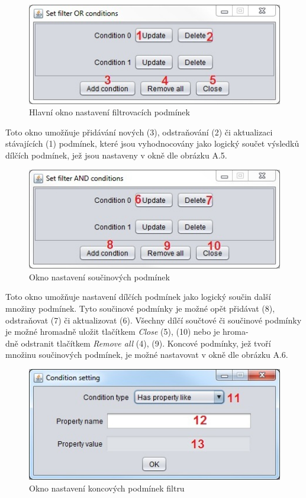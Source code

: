 \documentclass{projekt}
\begin{document}
\begin{figure}[htb!]
\begin{center}
\includegraphics[scale=0.8]{manualTestFilterA.jpg}
\caption{Hlavní okno nastavení filtrovacích podmínek}
\end{center}
\end{figure}
\thispagestyle{plain}

Toto okno umožňuje přidávání nových (3), odstraňování (2) či aktualizaci stávajících (1) podmínek, které jsou vyhodnocovány jako logický součet výsledků dílčích podmínek, jež jsou nastaveny v okně dle obrázku A.5. 

\begin{figure}[htb!]
\begin{center}
\includegraphics[scale=0.8]{manualTestFilterB.jpg}
\caption{Okno nastavení součinových podmínek}
\end{center}
\end{figure}

Toto okno umožňuje nastavení dílčích podmínek jako logický součin další množiny podmínek. Tyto součinové podmínky je možné opět přidávat (8), odstraňovat (7) či aktualizovat (6). Všechny dílčí součtové či součinové podmínky je možné hromadně uložit tlačítkem {\it Close} (5), (10) nebo je hroma-\\dně odstranit tlačítkem {\it Remove all} (4), (9). 
Koncové podmínky, jež tvoří množinu součinových podmínek, je možné nastavovat v okně dle obrázku A.6.



\begin{figure}[htb!]
\begin{center}
\includegraphics[scale=0.8]{manualTestFilterC.jpg}
\caption{Okno nastavení koncových podmínek filtru}
\end{center}
\end{figure}
\end{document}
